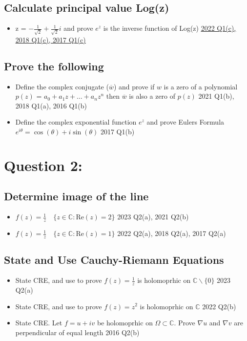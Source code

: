 \documentclass[a4paper, 8pt]{extarticle}
\begin{document}
\subsection{Calculate principal value Log(z)}
\begin{itemize}
	\item z = $-\frac{1}{\sqrt{2}} + \frac{1}{\sqrt{2}} i$ and prove $e^z$ is the inverse function of Log(z) \hfill \hyperref[sol:2022Q1c]{\uline{2022 Q1(c), 2018 Q1(c), 2017 Q1(c)}}
\end{itemize}
\subsection{Prove the following}
\begin{itemize}
	\item Define the complex conjugate ($\overline{w}$) and prove if $w$ is a zero of a polynomial $p(z)$ = $a_0 + a_1 z + \ldots + a_n z^n$ then $\overline{w}$ is also a zero of $p(z)$ \hfill 2021 Q1(b), 2018 Q1(a), 2016 Q1(b)
	\item Define the complex exponential function $e^z$ and prove Eulers Formula $e^{i \theta} = \cos(\theta) + i \sin(\theta)$ \hfill 2017 Q1(b)
\end{itemize}





\pagebreak


\section{Question 2: }
\subsection{Determine image of the line}
\begin{itemize}
	\item $f(z) = \frac{1}{z} \quad \{z \in \mathbb{C}: \text{Re}(z) = 2\}$ \hfill 2023 Q2(a), 2021 Q2(b)
	\item $f(z) = \frac{1}{z} \quad \{z \in \mathbb{C}: \text{Re}(z) = 1\}$ \hfill 2022 Q2(a), 2018 Q2(a), 2017 Q2(a)
\end{itemize}
\subsection{State and Use Cauchy-Riemann Equations}
\begin{itemize}
	\item State CRE, and use to prove $f(z) = \frac{1}{z}$ is holomoprhic on $\mathbb{C} \backslash \{0\}$ \hfill 2023 Q2(a)
	\item State CRE, and use to prove $f(z) = z^2$ is holomoprhic on $\mathbb{C}$ \hfill 2022 Q2(b)
	\item State CRE. Let $f = u+iv$ be holomoprhic on $\Omega \subset \mathbb{C}$. Prove $\nabla u$ and $\nabla v$ are perpendicular of equal length \hfill 2016 Q2(b)
\end{itemize}
\end{document}

